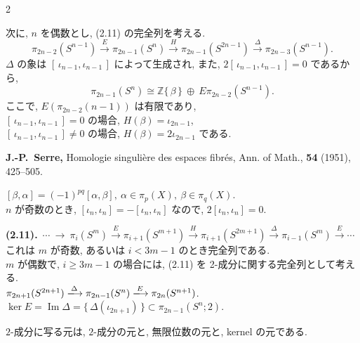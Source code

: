 \documentclass[10pt, leqno]{ltjsarticle}
\newcommand{\Ex}{E}        %
\newcommand{\gen}[1]{\{\,#1\,\}}       %
\newcommand{\im}{\operatorname{Im}}
\newcommand{\pis}[2]{\pi_{#1}(#2)}       %
\numberwithin{equation}{section}
\theoremstyle{plain}
\theoremstyle{definition}
\theoremstyle{remark}
\begin{document}
\begin{paracol}{2}

次に, $n$ を偶数とし, (2.11) の完全列を考える. 
\[
\pis{2n-2}{S^{n-1}} \xrightarrow{\ \Ex\ } \pis{2n-1}{S^{n}}
\xrightarrow{\ H\ } \pis{2n-1}{S^{2n-1}}
\xrightarrow{\ \Delta\ } \pis{2n-3}{S^{n-1}}.
\]
$\Delta$ の象は $[\,\iota_{n-1},\iota_{n-1}\,]$ によって生成され, 
また, $2[\,\iota_{n-1},\iota_{n-1}\,]=0$ であるから, 
\[
\pis{2n-1}{S^{n}} \cong
\mathbb{Z}\gen{\beta}\ \oplus\ 
E\pis{2n-2}{S^{n-1}} .
\]
ここで,
\(E(\pis{2n-2}{n-1})\) は有限であり, \\
$[\,\iota_{n-1},\iota_{n-1}\,]=0$ の場合, $H(\beta)=\iota_{2n-1}$,\\
$[\,\iota_{n-1},\iota_{n-1}\,]\ne0$ の場合, $H(\beta)=2\iota_{2n-1}$ である. 

\switchcolumn

\noindent
\textbf{\cite{Serre1951}
J.-P.~Serre,}
\newblock Homologie singulière des espaces fibrés,
\newblock Ann. of Math., {\bf 54} (1951), 425--505.

\noindent
\([\beta, \alpha] = (-1)^{pq}[\alpha, \beta],\ 
\alpha\in\pis{p}{X},\ \beta\in\pis{q}{X}\).\\
\(n\) が奇数のとき,
\([\iota_n, \iota_n] = -[\iota_n, \iota_n]\)
なので, \(2[\iota_n, \iota_n] = 0.\)

\noindent
\textbf{(2.11).}\ 
\(\cdots\ \longrightarrow\ 
\pi_i(S^m)\xrightarrow{\,E\,}\pi_{i+1}(S^{m+1})\xrightarrow{\,H\,}
\pi_{i+1}(S^{2m+1})\xrightarrow{\,\Delta\,}\pi_{i-1}(S^m)\xrightarrow{\,E\,}\cdots
\)\\
これは $m$ が奇数, あるいは $i<3m-1$ のとき完全列である. \\
$m$ が偶数で, $i\ge 3m-1$ の場合には, (2.11) を
2-成分に関する完全列として考える. \\
\(\pis{2n+1}{S^{2n+1}}\xlongrightarrow{\Delta}
\pis{2n-1}{S^{n}}\xlongrightarrow{E}
\pis{2n}{S^{n+1}}\).\\
\(\ker E = \im \Delta = \gen{\Delta(\iota_{2n+1})}
\subset\pis{2n-1}{S^n; 2}\).

\noindent
\(2\)-成分に写る元は,
\(2\)-成分の元と, 無限位数の元と, kernel の元である.



\end{paracol}
\end{document}
